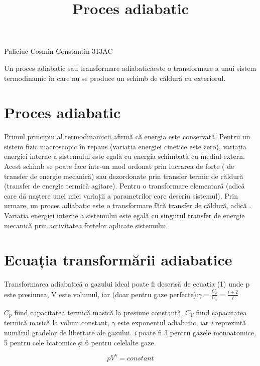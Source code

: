 \documentclass[11pt]{article}
\title{Proces adiabatic}
\begin{document}
	\maketitle
	
	\begin{center}
	Paliciuc Cosmin-Constantin 313AC
	\end{center}
	
	
	{\footnotesize Un proces adiabatic sau transformare adiabaticăeste o transformare a unui sistem termodinamic în care nu se produce un schimb de căldură cu exteriorul.\par}
	
	\section{Proces adiabatic}
	
	Primul principiu al termodinamicii afirmă că energia este conservată. Pentru un sistem fizic macroscopic în repaus (variația energiei cinetice este zero), variația energiei interne a sistemului este egală cu energia schimbată cu mediul extern. Acest schimb se poate face într-un mod ordonat prin lucrarea de forțe ( de transfer de energie mecanică) sau dezordonate prin transfer termic de căldură (transfer de energie termică agitare). Pentru o transformare elementară (adică care dă naștere unei mici variații a parametrilor care descriu sistemul). Prin urmare, un proces adiabatic este o transformare fără transfer de căldură, adică . Variația energiei interne a sistemului este egală cu singurul transfer de energie mecanică prin activitatea forțelor aplicate sistemului.
	
	\section{Ecuația transformării adiabatice}
	
	Transformarea adiabatică a gazului ideal poate fi descrisă de ecuația (1) unde p este presiunea, V este volumul, iar (doar pentru gaze perfecte):\( \gamma  =\frac{C_{p}}{C_{v}} =\frac{i+2}{i}\)
	
	\( C_{p}\) fiind capacitatea termică masică la presiune constantă, \( C_{V}\)  fiind capacitatea termică masică la volum constant, \( \gamma\) este exponentul adiabatic, iar \textit{i} reprezintă numărul gradelor de libertate ale gazului. \textit{i} poate fi 3 pentru gazele monoatomice, 5 pentru cele biatomice și 6 pentru celelalte gaze.
	
	\begin{equation}
	pV^{\gamma } = constant
	\end{equation}
	
\end{document}
